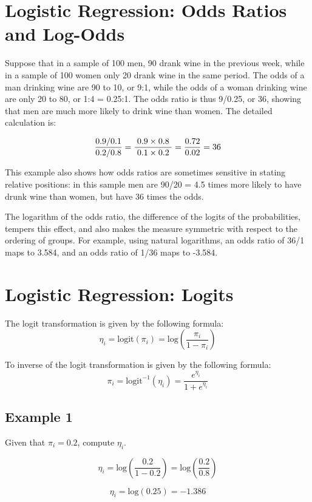 \newpage
\section{Logistic Regression: Odds Ratios and Log-Odds}
Suppose that in a sample of 100 men, 90 drank wine in the previous week, while in a sample of 100 women only 20 drank wine in the same period. The odds of a man drinking wine are 90 to 10, or 9:1, while the odds of a woman drinking wine are only 20 to 80, or 1:4 = 0.25:1. The odds ratio is thus 9/0.25, or 36, showing that men are much more likely to drink wine than women. The detailed calculation is:

\[ { 0.9/0.1 \over 0.2/0.8}=\frac{\;0.9\times 0.8\;}{\;0.1\times 0.2\;} ={0.72 \over 0.02} = 36 \]

This example also shows how odds ratios are sometimes sensitive in stating relative positions: in this sample men are 90/20 = 4.5 times more likely to have drunk wine than women, but have 36 times the odds. 


The logarithm of the odds ratio, the difference of the logits of the probabilities, tempers this effect, and also makes the measure symmetric with respect to the ordering of groups. For example, using natural logarithms, an odds ratio of 36/1 maps to 3.584, and an odds ratio of 1/36 maps to -3.584.


\section{Logistic Regression: Logits}

The logit transformation is given by the following formula: 
\[ \eta_i = \mbox{logit}(\pi_i)  = \mbox{log}\left( \frac{\pi_i}{1- \pi_i} \right) \]

To inverse of the logit transformation is given by the following formula: 
\[ \pi_i = \mbox{logit}^{-1}(\eta_i)  =  \frac{e^{\eta_i}}{1 + e^{\eta_i}} \]

\subsection{Example 1}
Given that $\pi_i = 0.2$, compute $\eta_i$.

\[ \eta_i = \mbox{log}\left( \frac{0.2}{1-0.2} \right)= \mbox{log}\left( \frac{0.2}{0.8} \right)\] 

\[ \eta_i =  \mbox{log}(0.25) =-1.386 \]

